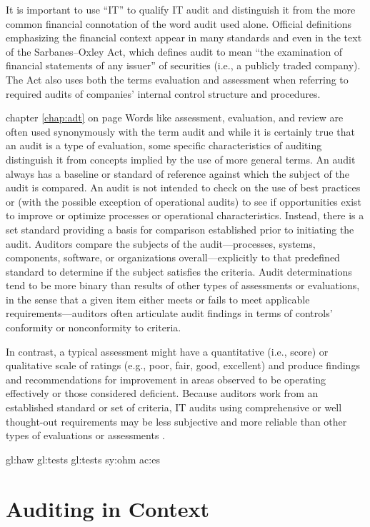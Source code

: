 It is important to use “IT” to qualify IT audit and distinguish it from the more common financial connotation of the word audit used alone. Official definitions emphasizing the financial context appear in many standards and even in the text of the Sarbanes–Oxley Act, which defines audit to mean “the examination of financial statements of any issuer” of securities (i.e., a publicly traded company). The Act also uses both the terms evaluation and assessment when referring to required audits of companies’ internal control structure and procedures.

chapter \ref{chap:adt} on page \pageref{chap:adt} Words like assessment, evaluation, and review are often used synonymously with the term audit and while it is certainly true that an audit is a type of
evaluation, some specific characteristics of auditing distinguish it from concepts
implied by the use of more general terms. An audit always has a baseline or standard of reference against which the subject of the audit is compared. An audit is not
intended to check on the use of best practices or (with the possible exception of
operational audits) to see if opportunities exist to improve or optimize processes
or operational characteristics. Instead, there is a set standard providing a basis for
comparison established prior to initiating the audit. Auditors compare the subjects of the audit—processes, systems, components, software, or organizations
overall—explicitly to that predefined standard to determine if the subject satisfies the criteria. Audit determinations tend to be more binary than results of other
types of assessments or evaluations, in the sense that a given item either meets or
fails to meet applicable requirements—auditors often articulate audit findings in
terms of controls’ conformity or nonconformity to criteria.

In contrast, a typical assessment might have a quantitative (i.e., score) or qualitative scale of ratings (e.g., poor, fair, good,
excellent) and produce findings and recommendations for improvement in areas
observed to be operating effectively or those considered deficient. Because auditors
work from an established standard or set of criteria, IT audits using comprehensive or well thought-out requirements may be less subjective and more reliable than
other types of evaluations or assessments \citep{GANTZ20141}.

\gls{gl:haw}
\glspl{gl:test}
\Glspl{gl:test}
\gls{sy:ohm}
\gls{ac:es}

\section{Auditing in Context}

